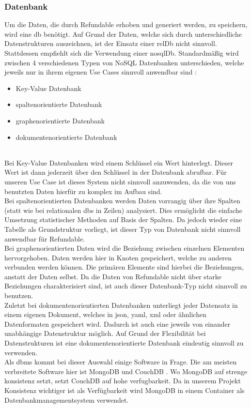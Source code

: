 		\subsubsection{Datenbank}
		\label{sec:db}
		Um die Daten, die durch Refundable erhoben und generiert werden, zu speichern, wird eine \gls{db} benötigt. Auf Grund der Daten, welche sich durch unterschiedliche Datenstrukturen auszeichnen, ist der Einsatz einer \gls{relDb} nicht sinnvoll. Stattdessen empfiehlt sich die Verwendung einer \gls{nosqlDb}.
		Standardmäßig wird zwischen 4 verschiedenen Typen von NoSQL Datenbanken unterschieden, welche jeweils nur in ihrem eigenen Use Cases sinnvoll anwendbar sind \cite{nosqltypes}:
		\begin{itemize}
			\item Key-Value Datenbank
			\item spaltenorientierte Datenbank
			\item graphenorientierte Datenbank
			\item dokumentenorientierte Datenbank
		\end{itemize}
		\label{code:nosqltypes}~\\	
		Bei Key-Value Datenbanken wird einem Schlüssel ein Wert hinterlegt. Dieser Wert ist dann jederzeit über den Schlüssel in der Datenbank abrufbar. Für unseren Use Case ist dieses System nicht sinnvoll anzuwenden, da die von uns benutzten Daten hierfür zu komplex im Aufbau sind.~\\
		Bei spaltenorientierten Datenbanken werden Daten vorrangig über ihre Spalten (statt wie bei relationalen \gls{db}s in Zeilen) analysiert. Dies ermöglicht die einfache Umsetzung statistischer Methoden auf Basis der Spalten. Da jedoch wieder eine Tabelle als Grundstruktur vorliegt, ist dieser Typ von Datenbank nicht sinnvoll anwendbar für Refundable.~\\
		Bei graphenorientierten Daten wird die Beziehung zwischen einzelnen Elementen hervorgehoben. Daten werden hier in Knoten gespeichert, welche zu anderen verbunden werden können. Die primären Elemente sind hierbei die Beziehungen, anstatt der Daten selbst. Da die Daten von Refundable nicht über starke Beziehungen charakterisiert sind, ist auch dieser Datenbank-Typ nicht sinnvoll zu benutzen.~\\		
		Zuletzt bei dokumentenorientierten Datenbanken unterliegt jeder Datensatz in einem eigenen Dokument, welches in \Gls{json}, \Gls{yaml}, \Gls{xml} oder ähnlichen Datenformaten gespeichert wird. Dadurch ist auch eine jeweils von einander unabhängige Datenstruktur möglich. Auf Grund der Flexibilität bei Datenstrukturen ist eine dokumentenorientierte Datenbank eindeutig sinnvoll zu verwenden.~\\
		Als \gls{dbms} kommt bei dieser Auswahl einige Software in Frage. Die am meisten verbreitete Software hier ist MongoDB und CouchDB \cite{mongo}. Wo MongoDB auf strenge \gls{konsistenz} setzt, setzt CouchDB auf hohe \gls{verfugbarkeit}. Da in unserem Projekt Konsistenz wichtiger ist als Verfügbarkeit wird MongoDB in einem Container als Datenbankmanagementsystem verwendet.
		
